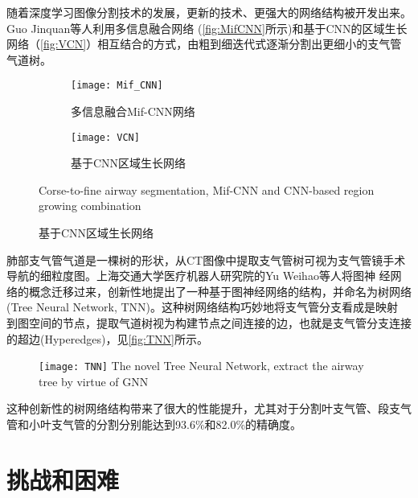 	 随着深度学习图像分割技术的发展，更新的技术、更强大的网络结构被开发出来。Guo Jinquan等人\cite{Guo2021CoarsetofineAS}利用多信息融合网络
	 (\autoref{fig:MifCNN}所示)和基于CNN的区域生长网络（\autoref{fig:VCN}）相互结合的方式，由粗到细迭代式逐渐分割出更细小的支气管气道树。
	 \begin{figure}[t]
	 	\centering
	 	
	 	\begin{subfigure}{0.70\textwidth}
	 		\centering
	 		\texttt{[image: Mif\_CNN]}
	 		\caption{多信息融合Mif-CNN网络}
	 		\label{fig:MifCNN}
	 	\end{subfigure}
	 	\hfill	 	
	 	\begin{subfigure}{0.29\textwidth}
	 		\centering
	 		\texttt{[image: VCN]}
	 		\caption{基于CNN区域生长网络}
	 		\label{fig:VCN}
	 	\end{subfigure}
	 	
	 		{Corse-to-fine airway segmentation, Mif-CNN and CNN-based region growing combination}
	 \end{figure}
	 
	 肺部支气管气道是一棵树的形状，从CT图像中提取支气管树可视为支气管镜手术导航的细粒度图。上海交通大学医疗机器人研究院的Yu Weihao等人\cite{Yu2022TNN}将图神
	 经网络的概念迁移过来，创新性地提出了一种基于图神经网络的结构，并命名为树网络(Tree Neural Network, TNN\cite{Yu2022TNN})。这种树网络结构巧妙地将支气管分支看成是映射
	 到图空间的节点，提取气道树视为构建节点之间连接的边，也就是支气管分支连接的超边(Hyperedges)，见\autoref{fig:TNN}所示。
	 \begin{figure}[hbp]
	 	\centering
	 	\texttt{[image: TNN]}
	 		{The novel Tree Neural Network, extract the airway tree by virtue of GNN}
		\label{fig:TNN}
	 \end{figure}
	 
	 这种创新性的树网络结构带来了很大的性能提升，尤其对于分割叶支气管、段支气管和小叶支气管的分割分别能达到93.6\%和82.0\%\cite{Yu2022TNN}的精确度。



\section{挑战和困难}


